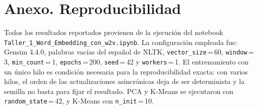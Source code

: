 \documentclass[12pt, a4paper]{article}
\newcommand{\code}[1]{\texttt{#1}}
\begin{document}
\section*{Anexo. Reproducibilidad}

Todos los resultados reportados provienen de la ejecución del notebook
\code{Taller\_1\_\allowbreak Word\_\allowbreak Embedding\_\allowbreak con\_w2v.ipynb}. La configuración empleada fue: Gensim 4.4.0,
palabras vacías del español de NLTK, \code{vector\_size}\,=\,60, \code{window}\,=\,3,
\code{min\_count}\,=\,1, \code{epochs}\,=\,200, \code{seed}\,=\,42 y \code{workers}\,=\,1. El
entrenamiento con un único hilo es condición necesaria para la reproducibilidad exacta: con varios
hilos, el orden de las actualizaciones asincrónicas deja de ser determinista y la semilla no basta
para fijar el resultado. PCA y K-Means se ejecutaron con \code{random\_state}\,=\,42, y K-Means con
\code{n\_init}\,=\,10.
\end{document}
